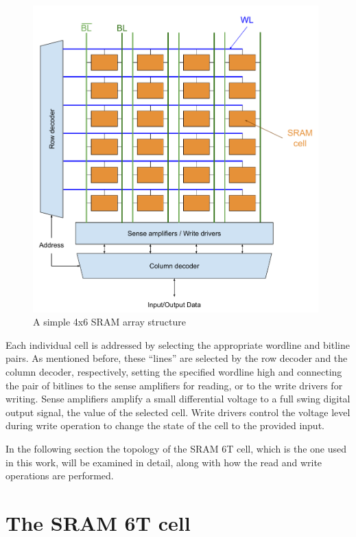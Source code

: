 \begin{figure}[H]
    \centering
    \includegraphics[width=11cm]{images/SRAM Architecture.pdf}
    \caption{A simple 4x6 SRAM array structure}
    \label{fig:SRAM_array}
\end{figure}

 Each individual cell is addressed by selecting the appropriate wordline and bitline pairs. As mentioned before, these ``lines'' are selected by the row decoder and the column decoder, respectively, setting the specified wordline high and connecting the pair of bitlines to the sense amplifiers for reading, or to the write drivers for writing. Sense amplifiers amplify a small differential voltage to a full swing digital output signal, the value of the selected cell. Write drivers control the voltage level during write operation to change the state of the cell to the provided input.  
 
 In the following section the topology of the SRAM 6T cell, which is the one used in this work, will be examined in detail, along with how the read and write operations are performed. 





\section{The SRAM 6T cell}



